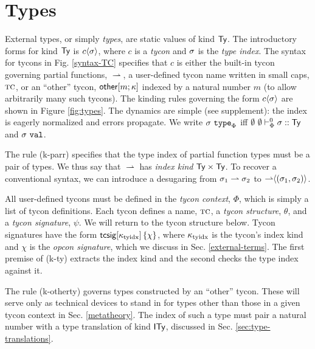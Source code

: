 \documentclass[10pt,preprint]{sigplanconf}
\newcommand{\rulename}[1]{(#1)}
\begin{document}
\section{Types}\label{types}


External types, or simply \emph{types}, are static values of kind ${\sf Ty}$. The introductory forms for kind ${\sf Ty}$ is ${c}\langle\sigma\rangle$, where $c$ is a \emph{tycon} and $\sigma$ is the \emph{type index}. The syntax  for tycons in Fig. \ref{syntax-TC} specifies that $c$ is either the built-in tycon governing partial functions, $\rightharpoonup$, a user-defined tycon name written in small caps, $\textsc{tc}$, or an ``other'' tycon, ${\sf other}[m; \kappa]$ indexed by a natural number $m$ (to allow arbitrarily many such tycons). The kinding rules governing the form ${c}\langle\sigma\rangle$ are shown in Figure \ref{fig:types}. The dynamics are simple (see supplement): the index is eagerly normalized and errors propagate. We write $\sigma~\texttt{type}_{\Phi}$  iff $\emptyset~\emptyset \vdash_{\Phi}^{0} \sigma :: {\sf Ty}$ and $\sigma~\mathtt{val}$. 

The rule \rulename{k-parr} specifies that the type index of partial function types must be a pair of types. We thus say that $\rightharpoonup$ has \emph{index kind} ${\sf Ty} \times {\sf Ty}$. To recover a conventional syntax, we can introduce a desugaring from $\sigma_1 \rightharpoonup \sigma_2$ to ${\rightharpoonup}\langle(\sigma_1, \sigma_2)\rangle$. %


All user-defined tycons must be defined in the \emph{tycon context}, $\Phi$, which is simply a list of tycon definitions. Each tycon defines a name, $\textsc{tc}$, a \emph{tycon structure}, $\theta$, and a \emph{tycon signature}, $\psi$. We will return to the tycon structure below. Tycon signatures have the form ${\sf tcsig}[\kappa_\text{tyidx}]\,\{\chi\}$, where $\kappa_\text{tyidx}$ is the tycon's index kind and $\chi$ is the \emph{opcon signature}, which we   discuss in Sec. \ref{external-terms}. The first premise of \rulename{k-ty} extracts the index kind and the second checks the type index against it. 

The rule (k-otherty) governs types constructed by an ``other'' tycon. These will serve only as technical devices to stand in for types other than those in a given tycon context in Sec. \ref{metatheory}. The index of such a type must pair a natural number with a type translation of kind ${\sf ITy}$, discussed in Sec. \ref{sec:type-translations}.
\end{document}
